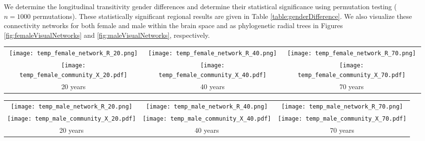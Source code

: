 We determine the longitudinal transitivity gender differences and determine their
statistical significance using permutation testing ($n = 1000$ permutations).  These statistically significant regional results are given in Table \ref{table:genderDifference}.  
We also visualize these connectivity networks for both female and male within the brain
space and as phylogenetic radial trees in Figures \ref{fig:femaleVisualNetworks} and \ref{fig:maleVisualNetworks}, respectively.

\begin{figure*}[htb]
  \centering
  \begin{tabular}{ccc}
  \texttt{[image: temp\_female\_network\_R\_20.png]} &
  \texttt{[image: temp\_female\_network\_R\_40.png]} &
  \texttt{[image: temp\_female\_network\_R\_70.png]} \\
  \texttt{[image: temp\_female\_community\_X\_20.pdf]} &
  \texttt{[image: temp\_female\_community\_X\_40.pdf]} &
  \texttt{[image: temp\_female\_community\_X\_70.pdf]} \\
  20 years & 40 years & 70 years 
  \end{tabular}
  \caption{Visual illustration of the female thickness networks for ages 20, 40, 
  and 70 years.  Community relationships between regions are depicted both in 
  brain space (top row) and as a radial phylogenetic tree where colors denote 
  neighborhoods (bottom row).
  }
  \label{fig:femaleVisualNetworks}
\end{figure*}

\begin{figure*}[htb]
  \centering
  \begin{tabular}{ccc}
  \texttt{[image: temp\_male\_network\_R\_20.png]} &
  \texttt{[image: temp\_male\_network\_R\_40.png]} &
  \texttt{[image: temp\_male\_network\_R\_70.png]} \\
  \texttt{[image: temp\_male\_community\_X\_20.pdf]} &
  \texttt{[image: temp\_male\_community\_X\_40.pdf]} &
  \texttt{[image: temp\_male\_community\_X\_70.pdf]} \\
  20 years & 40 years & 70 years 
  \end{tabular}
  \caption{Visual illustration of the male thickness networks for ages 20, 40, 
  and 70 years.  Community relationships between regions are depicted both in 
  brain space (top row) and as a radial phylogenetic tree where colors denote 
  neighborhoods (bottom row).
  }
  \label{fig:maleVisualNetworks}
\end{figure*}



